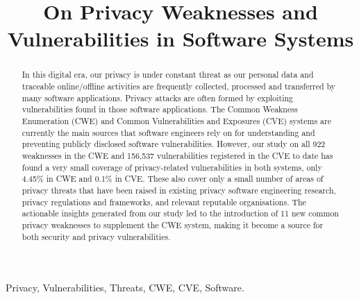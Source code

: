 \documentclass[10pt,conference]{IEEEtran}
\begin{document}
\title{On Privacy Weaknesses and Vulnerabilities in Software Systems
}

\author{
	\and
	\and
}

\maketitle

\begin{abstract}
In this digital era, our privacy is under constant threat as our personal data and traceable online/offline activities are frequently collected, processed and transferred by many software applications. Privacy attacks are often formed by exploiting vulnerabilities found in those software applications. The Common Weakness Enumeration (CWE) and Common Vulnerabilities and Exposures (CVE) systems are currently the main sources that software engineers rely on for understanding and preventing publicly disclosed software vulnerabilities. However, our study on all 922 weaknesses in the CWE and 156,537 vulnerabilities registered in the CVE to date has found a very small coverage of privacy-related vulnerabilities in both systems, only 4.45\% in CWE and 0.1\% in CVE. These also cover only a small number of areas of privacy threats that have been raised in existing privacy software engineering research, privacy regulations and frameworks, and relevant reputable organisations. The actionable insights generated from our study led to the introduction of 11 new common privacy weaknesses to supplement the CWE system, making it become a source for both security and privacy vulnerabilities.
\end{abstract}

\begin{IEEEkeywords}
Privacy, Vulnerabilities, Threats, CWE, CVE, Software.
\end{IEEEkeywords}

\maketitle










\balance


\end{document}
